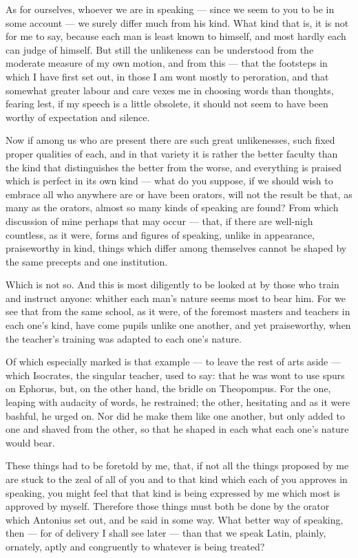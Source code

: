  As for ourselves, whoever we are in speaking — since we seem to you to be in some account — we surely differ much from his kind. What kind that is, it is not for me to say, because each man is least known to himself, and most hardly each can judge of himself. But still the unlikeness can be understood from the moderate measure of my own motion, and from this — that the footsteps in which I have first set out, in those I am wont mostly to peroration, and that somewhat greater labour and care vexes me in choosing words than thoughts, fearing lest, if my speech is a little obsolete, it should not seem to have been worthy of expectation and silence.

 Now if among us who are present there are such great unlikenesses, such fixed proper qualities of each, and in that variety it is rather the better faculty than the kind that distinguishes the better from the worse, and everything is praised which is perfect in its own kind — what do you suppose, if we should wish to embrace all who anywhere are or have been orators, will not the result be that, as many as the orators, almost so many kinds of speaking are found? From which discussion of mine perhaps that may occur — that, if there are well-nigh countless, as it were, forms and figures of speaking, unlike in appearance, praiseworthy in kind, things which differ among themselves cannot be shaped by the same precepts and one institution.

 Which is not so. And this is most diligently to be looked at by those who train and instruct anyone: whither each man's nature seems most to bear him. For we see that from the same school, as it were, of the foremost masters and teachers in each one's kind, have come pupils unlike one another, and yet praiseworthy, when the teacher's training was adapted to each one's nature.

 Of which especially marked is that example — to leave the rest of arts aside — which Isocrates, the singular teacher, used to say: that he was wont to use spurs on Ephorus, but, on the other hand, the bridle on Theopompus. For the one, leaping with audacity of words, he restrained; the other, hesitating and as it were bashful, he urged on. Nor did he make them like one another, but only added to one and shaved from the other, so that he shaped in each what each one's nature would bear.

 These things had to be foretold by me, that, if not all the things proposed by me are stuck to the zeal of all of you and to that kind which each of you approves in speaking, you might feel that that kind is being expressed by me which most is approved by myself. Therefore those things must both be done by the orator which Antonius set out, and be said in some way. What better way of speaking, then — for of delivery I shall see later — than that we speak Latin, plainly, ornately, aptly and congruently to whatever is being treated?

